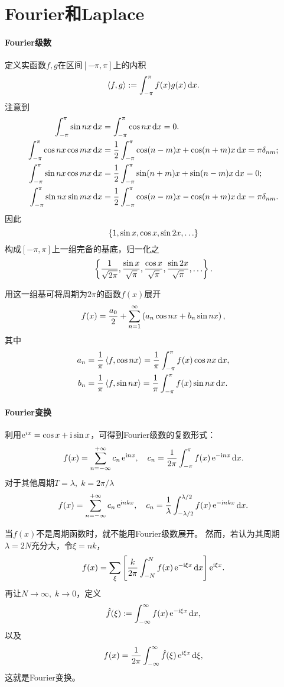 \section{Fourier和Laplace}

\paragraph{Fourier级数}
定义实函数$f,g$在区间$[-\pi,\pi]$上的内积
\[\left\langle f,g\right\rangle:=\int_{-\pi}^\pi f(x)g(x)\mathop{}\!\mathrm{d} x.\]
注意到
\begin{subequations}
	\label{eqn:intsincos}
	\begin{align}
		\int_{-\pi}^\pi\sin nx\d x&=\int_{-\pi}^\pi\cos nx\d x=0.\\
		\int_{-\pi}^\pi\cos nx\cos mx\d x & =\frac12\int_{-\pi}^\pi\cos(n-m)x+\cos(n+m)x\d x=\pi\delta_{nm};\\
		\int_{-\pi}^\pi\sin nx\cos mx\d x & =\frac12\int_{-\pi}^\pi\sin(n+m)x+\sin(n-m)x\d x=0; \\             
		\int_{-\pi}^\pi\sin nx\sin mx\d x & =\frac12\int_{-\pi}^\pi\cos(n-m)x-\cos(n+m)x\d x=\pi\delta_{nm} .
	\end{align}
\end{subequations}
因此
\[\left\{1,\sin x,\cos x,\sin2x,\ldots\right\}\]
构成$[-\pi,\pi]$上一组完备的基底，归一化之
\[\left\{\frac1{\sqrt{2\pi}},\frac{\sin x}{\sqrt\pi},\frac{\cos x}{\sqrt\pi},\frac{\sin2x}{\sqrt\pi},\ldots\right\}.\]

用这一组基可将周期为$2\pi$的函数$f(x)$展开
\[f(x)=\frac{a_0}2+\sum_{n=1}^\infty\left(a_n\cos nx+b_n\sin nx\right),\]
其中
\begin{align*}
	a_n & =\frac1\pi\left\langle f,\cos nx\right\rangle=\frac1\pi\int_{-\pi}^\pi f(x)\cos nx\mathop{}\!\mathrm{d} x, \\
	b_n & =\frac1\pi\left\langle f,\sin nx\right\rangle=\frac1\pi\int_{-\pi}^\pi f(x)\sin nx\mathop{}\!\mathrm{d} x.
\end{align*}

\paragraph{Fourier变换}
利用$\mathop{}\!\mathrm{e}^{ix}=\cos x+\mathrm{i}\sin x$，可得到Fourier级数的复数形式：
\[f(x)=\sum_{n=-\infty}^{+\infty}c_n\mathop{}\!\mathrm{e}^{\mathrm{i} nx},\quad c_n=\frac1{2\pi}\int_{-\pi}^\pi f(x)\mathop{}\!\mathrm{e}^{-\mathrm{i} nx}\mathop{}\!\mathrm{d} x.\]
对于其他周期$T=\lambda,\;k=2\pi/\lambda$
\[f(x)=\sum_{n=-\infty}^{+\infty}c_n\mathop{}\!\mathrm{e}^{\mathrm{i} nkx},\quad c_n=\frac1\lambda\int_{-\lambda/2}^{\lambda/2} f(x)\mathop{}\!\mathrm{e}^{-\mathrm{i} nkx}\mathop{}\!\mathrm{d} x.\]

当$f(x)$不是周期函数时，就不能用Fourier级数展开。
然而，若认为其周期$\lambda=2N$充分大，令$\xi=nk$，
\[f(x)=\sum_\xi\left[\frac{k}{2\pi}\int_{-N}^Nf(x)\mathop{}\!\mathrm{e}^{-\mathrm{i}\xi x}\mathop{}\!\mathrm{d} x\right]\mathop{}\!\mathrm{e}^{\mathrm{i}\xi x}.\]
再让$N\to\infty,\;k\to0$，定义
\[\hat f(\xi):=\int_{-\infty}^\infty f(x)\mathop{}\!\mathrm{e}^{-\mathrm{i}\xi x}\mathop{}\!\mathrm{d} x,\]
以及
\[f(x)=\frac1{2\pi}\int_{-\infty}^\infty\hat f(\xi)\mathop{}\!\mathrm{e}^{\mathrm{i}\xi x}\mathop{}\!\mathrm{d}\xi,\]
这就是Fourier变换。

